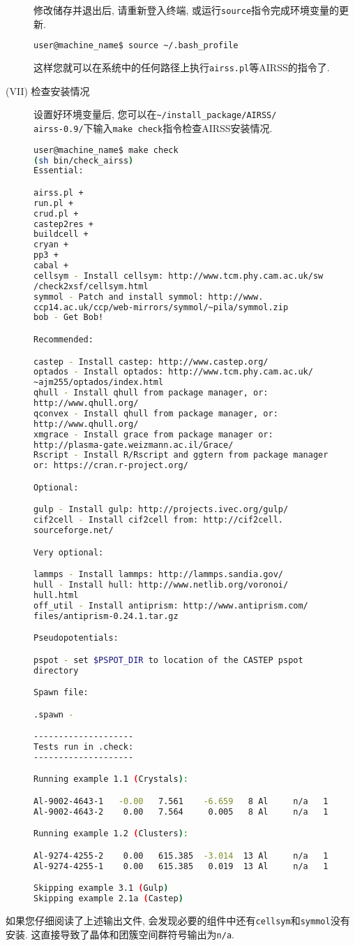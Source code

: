 \documentclass[a4paper, 10pt]{article}
\begin{document}
\begin{description}
修改储存并退出后, 请重新登入终端, 或运行\verb|source|指令完成环境变量的更新.
\begin{lstlisting}[language={bash}]
user@machine_name$ source ~/.bash_profile 
\end{lstlisting}

这样您就可以在系统中的任何路径上执行\verb|airss.pl|等AIRSS的指令了.

\item[(VII) 检查安装情况] 设置好环境变量后, 您可以在\verb|~/install_package/AIRSS/|
\\\verb|airss-0.9/|下输入\verb|make check|指令检查AIRSS安装情况. 
\begin{lstlisting}[language={bash}]
user@machine_name$ make check
(sh bin/check_airss)
Essential:

airss.pl +
run.pl +
crud.pl +
castep2res +
buildcell +
cryan +
pp3 +
cabal +
cellsym - Install cellsym: http://www.tcm.phy.cam.ac.uk/sw
/check2xsf/cellsym.html
symmol - Patch and install symmol: http://www.
ccp14.ac.uk/ccp/web-mirrors/symmol/~pila/symmol.zip
bob - Get Bob!

Recommended:

castep - Install castep: http://www.castep.org/
optados - Install optados: http://www.tcm.phy.cam.ac.uk/
~ajm255/optados/index.html
qhull - Install qhull from package manager, or: 
http://www.qhull.org/
qconvex - Install qhull from package manager, or: 
http://www.qhull.org/
xmgrace - Install grace from package manager or: 
http://plasma-gate.weizmann.ac.il/Grace/
Rscript - Install R/Rscript and ggtern from package manager
or: https://cran.r-project.org/

Optional:

gulp - Install gulp: http://projects.ivec.org/gulp/
cif2cell - Install cif2cell from: http://cif2cell.
sourceforge.net/

Very optional:

lammps - Install lammps: http://lammps.sandia.gov/
hull - Install hull: http://www.netlib.org/voronoi/
hull.html
off_util - Install antiprism: http://www.antiprism.com/
files/antiprism-0.24.1.tar.gz

Pseudopotentials:

pspot - set $PSPOT_DIR to location of the CASTEP pspot 
directory

Spawn file:

.spawn - 

--------------------
Tests run in .check:
--------------------

Running example 1.1 (Crystals):

Al-9002-4643-1   -0.00   7.561    -6.659   8 Al     n/a   1
Al-9002-4643-2    0.00   7.564     0.005   8 Al     n/a   1

Running example 1.2 (Clusters):

Al-9274-4255-2    0.00   615.385  -3.014  13 Al     n/a   1
Al-9274-4255-1    0.00   615.385   0.019  13 Al     n/a   1

Skipping example 3.1 (Gulp)
Skipping example 2.1a (Castep)
\end{lstlisting}       
\end{description}
如果您仔细阅读了上述输出文件, 会发现必要的组件中还有\verb|cellsym|和\verb|symmol|没有安装. 这直接导致了晶体和团簇空间群符号输出为\verb|n/a|. 
\end{document}
